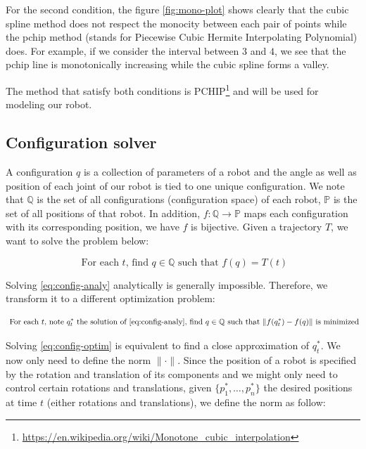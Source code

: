 \documentclass[a4paper, xcolor = usenames,dvipsnames]{article}
\begin{document}
For the second condition, the figure \ref{fig:mono-plot} shows clearly that the cubic spline method does not respect the monocity between each pair of points while the pchip method (stands for Piecewise Cubic Hermite Interpolating Polynomial) does. For example, if we consider the interval between \(3\) and \(4\), we see that the pchip line is monotonically increasing while the cubic spline forms a valley.

The method that satisfy both conditions is PCHIP\footnote{\url{https://en.wikipedia.org/wiki/Monotone_cubic_interpolation}} and will be used for modeling our robot.

\hypertarget{configuration-solver}{%
\subsection{Configuration solver}\label{configuration-solver}}

A configuration \(q\) is a collection of parameters of a robot and the angle as well as position of each joint of our robot is tied to one unique configuration. We note that \(\mathbb{Q}\) is the set of all configurations (configuration space) of each robot, \(\mathbb{P}\) is the set of all positions of that robot. In addition, \(f: \mathbb{Q} \rightarrow \mathbb{P}\) maps each configuration with its corresponding position, we have \(f\) is bijective. Given a trajectory \(T\), we want to solve the problem below:

\begin{equation}
  \text{ For each } t \text{, find } q \in \mathbb{Q} \text{ such that } f(q) = T(t) \label{eq:config-analy}
\end{equation}

Solving \eqref{eq:config-analy} analytically is generally impossible. Therefore, we transform it to a different optimization problem:

\begin{equation}
  \text{ For each } t \text{, note } q_{t}^{*} \text{ the solution of } \eqref{eq:config-analy} \text{, find } q \in \mathbb{Q} \text{ such that } \| f(q_{t}^{*}) - f(q) \| \text{ is minimized} \label{eq:config-optim}
\end{equation}

Solving \eqref{eq:config-optim} is equivalent to find a close approximation of \(q_{t}^{*}\). We now only need to define the norm \(\| \cdot \|\). Since the position of a robot is specified by the rotation and translation of its components and we might only need to control certain rotations and translations, given \(\{p_{1}^{*}, \dots, p_{n}^{*}\}\) the desired positions at time \(t\) (either rotations and translations), we define the norm as follow:
\end{document}
